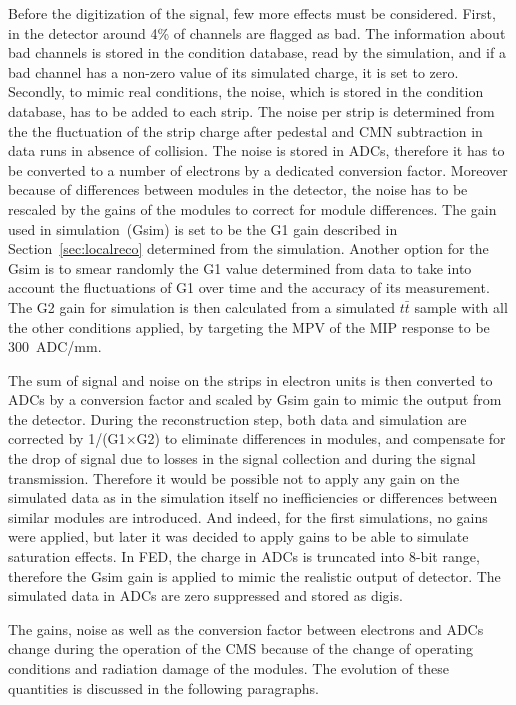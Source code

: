 Before the digitization of the signal, few more effects must be considered. First, in the detector around 4\% of channels are flagged as bad. The information about bad channels is stored in the condition database, read by the simulation, and if a bad channel has a non-zero value of its simulated charge, it is set to zero. Secondly, to mimic real conditions, the noise, which is stored in the condition database, has to be added to each strip. The noise per strip is determined from the the fluctuation of the strip charge after pedestal and CMN subtraction in data runs in absence of collision. The noise is stored in ADCs, therefore it has to be converted to a number of electrons by a dedicated conversion factor. Moreover because of differences between modules in the detector, the noise has to be rescaled by the gains of the modules to correct for module differences. The gain used in simulation~(Gsim) is set to be the G1 gain described in Section~\ref{sec:localreco} determined from the simulation. Another option for the Gsim is to smear randomly the G1 value determined from data to take into account the fluctuations of G1 over time and the accuracy of its measurement. The G2 gain for simulation is then calculated from a simulated $t\bar{t}$ sample with all the other conditions applied, by targeting the MPV of the MIP response to be 300~ADC/mm.

 The sum of signal and noise on the strips in electron units is then converted to ADCs by a conversion factor and scaled by Gsim gain to mimic the output from the detector. During the reconstruction step, both data and simulation are corrected by 1/(G1$\times$G2) to eliminate differences in modules, and compensate for the drop of signal due to losses in the signal collection and during the signal transmission. Therefore it would be possible not to apply any gain on the simulated data as in the simulation itself no inefficiencies or differences between similar modules are introduced. And indeed, for the first simulations, no gains were applied, but later it was decided to apply gains to be able to simulate saturation effects. In FED, the charge in ADCs is truncated into 8-bit range, therefore the Gsim gain is applied to mimic the realistic output of detector. The simulated data in ADCs are zero suppressed and stored as digis.

The gains, noise as well as the conversion factor between electrons and ADCs change during the operation of the CMS because of the change of operating conditions and radiation damage of the modules. The evolution of these quantities is discussed in the following paragraphs.   
 
